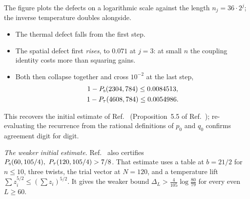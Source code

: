 \documentclass[aps,prl,reprint,amsmath,amssymb,nofootinbib,raggedbottom]{revtex4-2}
\begin{document}
\begin{proofdiagram}
\end{proofdiagram}
\noindent The figure plots the defects on a logarithmic scale against the
length $n_j=36\cdot2^j$; the inverse temperature doubles alongside.
\begin{itemize}
\item The thermal defect falls from the first step.
\item The spatial defect first \emph{rises}, to $0.071$ at $j=3$: at small
$n$ the coupling identity costs more than squaring gains.
\item Both then collapse together and cross $10^{-2}$ at the last step,
\begin{equation}
 \begin{gathered}
 1-P_{\mathrm s}(2304,784)\le0.0084513,\\ 1-P_{\tau}(4608,784)\le0.0054986 .
 \end{gathered}
 \label{eq:c-final}
\end{equation}
\end{itemize}
This recovers the initial estimate of Ref.~\cite{main} (Proposition~5.5 of Ref.~\cite{source}); re-evaluating the recurrence from the rational definitions of $p_0$ and $q_0$ confirms agreement digit for digit.

\emph{The weaker initial estimate.} Ref.~\cite{source} also certifies
$P_{\mathrm s}(60,105/4),\ P_{\tau}(120,105/4)>7/8$. That estimate uses a table at $b=21/2$ for
$n\le10$, three twists, the trial vector at $N=120$, and a temperature lift
$\sum z_i^{5/2}\le(\sum z_i)^{5/2}$. It gives the weaker bound
$\Delta_L>\frac4{105}\log\frac{80}{79}$ for every even $L\ge60$.
\end{document}
